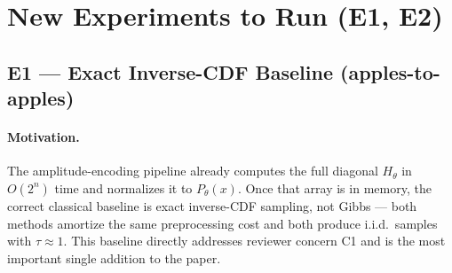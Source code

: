 \section{New Experiments to Run (E1, E2)}

\subsection{E1 --- Exact Inverse-CDF Baseline (apples-to-apples)}

\paragraph{Motivation.}  The amplitude-encoding pipeline already computes the
full diagonal $H_\theta$ in $O(2^n)$ time and normalizes it to $P_\theta(x)$.
Once that array is in memory, the correct classical baseline is exact
inverse-CDF sampling, not Gibbs --- both methods amortize the same
preprocessing cost and both produce i.i.d.\ samples with $\tau \approx 1$.
This baseline directly addresses reviewer concern C1 and is the most
important single addition to the paper.


